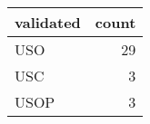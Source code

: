 \begin{tabular}{lr}
\toprule
validated & count \\
\midrule
USO & 29 \\
USC & 3 \\
USOP & 3 \\
\bottomrule
\end{tabular}
